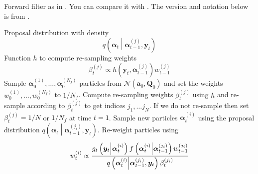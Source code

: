 \documentclass[notitlepage]{article}
\newcommand\StateX{\Statex\hspace{\algorithmicindent}}
\renewcommand{\vec}[1]{\bm{#1}}
\newcommand{\mat}[1]{\mathbf{#1}}
\newcommand{\Lparen}[1]{\left( #1\right)}
\newcommand{\Cond}[2]{ #1 \middle\vert  #2}
\newcommand{\optor}[2]{#1\Lparen{#2}}
\newcommand{\optorC}[3]{\optor{#1}{\Cond{#2}{#3}}}
\newcommand{\gFunc}[3]{\optorC{g_{#3}}{#1}{#2}}
\newcommand{\fFunc}[2]{\optorC{f}{#1}{#2}}
\newcommand{\normal}[2]{\optor{\mathcal{N}}{#1,#2}}
\newcommand{\IDC}[2]{\optorC{q}{#1}{#2}}
\newcommand{\partic}[3]{#1_{#2}^{\Lparen{#3}}}
\newcommand{\nPart}{N}
\newcommand{\nPeriods}{d}
\begin{document}
\begin{algorithm}[H]
\caption{Forward filter as in \cite{pitt99}. You can compare it with \citet[page 20 and 25]{doucet09}. The version and notation below is from \citet[page 449]{fearnhead10}.}\label{alg:forward}
\begin{algorithmic}[1]\raggedright
\INPUT
\Statex Proposal distribution with density 
\Statex $$
\IDC{\vec{\alpha}_t}{\partic{\vec{\alpha}}{t-1}{j}, \vec{y}_t}
$$
\Statex Function $h$ to compute re-sampling weights 
$$
	\partic{\beta}{t}{j} \propto h(\vec{y}_t,\partic{\vec{\alpha}}{t-1}{j})\partic{w}{t-1}{j}
$$
\State Sample $\partic{\vec{\alpha}}{0}{1},\dots,\partic{\vec{\alpha}}{0}{\nPart_f}$ particles from $\normal{\vec{a}_0}{\mat{Q}_0}$ and set the weights $\partic{w}{0}{1},\dots,\partic{w}{0}{\nPart_f}$ to $1 / \nPart_f$.
%
\For{$t=1,\dots, \nPeriods$}
\State Compute re-sampling weights $\partic{\beta}{t}{j}$ using $h$ and re-sample 
according to $\partic{\beta}{t}{j}$ to get indices $j_1,\dots j_\nPart$. If we do not 
re-sample then set $\partic{\beta}{t}{j} = 1 / \nPart$ or $1/ \nPart_f$ at time $t = 1$.
\EndProcedure
%
\State Sample new particles $\partic{\vec{\alpha}}{t}{i}$ using the proposal distribution $\IDC{\vec{\alpha}_t}{\partic{\vec{\alpha}}{t-1}{j_i}, \vec{y}_t}$.
\EndProcedure
%
\State Re-weight particles using 
\StateX \begin{equation}\label{eqn:forwardWeight}
	\partic{w}{t}{i} \propto \frac{
		\gFunc{\vec{y}_t}{\partic{\vec{\alpha}}{t}{i}}{t}
		\fFunc{\partic{\vec{\alpha}}{t}{i}}{\partic{\vec{\alpha}}{t-1}{j_i}}
		\partic{w}{t-1}{j_i}
	}{ %
		\IDC{\partic{\vec{\alpha}}{t}{i}}{\partic{\vec{\alpha}}{t-1}{j_i}, \vec{y}_t}
		\partic{\beta}{t}{j_i}
	}
\end{equation}
\EndProcedure
\EndFor
\end{algorithmic}
\end{algorithm}
\end{document}
